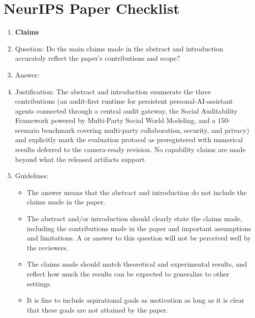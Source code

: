 \section*{NeurIPS Paper Checklist}

\begin{enumerate}

\item {\bf Claims}
    \item[] Question: Do the main claims made in the abstract and introduction accurately reflect the paper's contributions and scope?
    \item[] Answer: \answerYes{}
    \item[] Justification: The abstract and introduction enumerate the three contributions (an audit-first runtime for persistent personal-AI-assistant agents connected through a central audit gateway, the Social Auditability Framework powered by Multi-Party Social World Modeling, and a $150$-scenario benchmark covering multi-party collaboration, security, and privacy) and explicitly mark the evaluation protocol as preregistered with numerical results deferred to the camera-ready revision. No capability claims are made beyond what the released artifacts support.
    \item[] Guidelines:
    \begin{itemize}
        \item The answer \answerNA{} means that the abstract and introduction do not include the claims made in the paper.
        \item The abstract and/or introduction should clearly state the claims made, including the contributions made in the paper and important assumptions and limitations. A \answerNo{} or \answerNA{} answer to this question will not be perceived well by the reviewers.
        \item The claims made should match theoretical and experimental results, and reflect how much the results can be expected to generalize to other settings.
        \item It is fine to include aspirational goals as motivation as long as it is clear that these goals are not attained by the paper.
    \end{itemize}


\end{enumerate}
